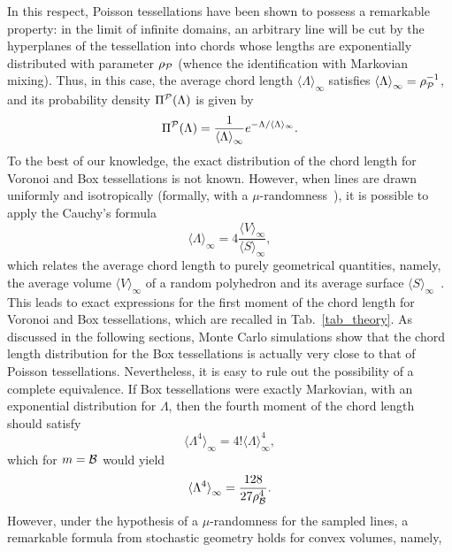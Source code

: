 \documentclass[final,authoryear,5p,times,twocolumn]{elsarticle}
\begin{document}
In this respect, Poisson tessellations have been shown to possess a remarkable property: in the limit of infinite domains, an arbitrary line will be cut by the hyperplanes of the tessellation into chords whose lengths are exponentially distributed with parameter $\rho_{\cal P}$ (whence the identification with Markovian mixing). Thus, in this case, the average chord length ${\langle \Lambda \rangle}_{\infty}$ satisfies ${\langle \Lambda \rangle}_{\infty}=\rho_{\cal P}^{-1}$, and its probability density $\Pi^{\cal P}(\Lambda)$ is given by
\begin{equation}
\Pi^{\cal P}(\Lambda)= \frac{1}{{\langle \Lambda \rangle}_{\infty}} e^{-\Lambda / \langle \Lambda \rangle_{\infty}}.
\end{equation}\label{markovian_density}
To the best of our knowledge, the exact distribution of the chord length for Voronoi and Box tessellations is not known. However, when lines are drawn uniformly and isotropically (formally, with a $\mu$-randomness~\cite{santalo, coleman}), it is possible to apply the Cauchy's formula
\begin{equation}
{\langle \Lambda \rangle}_{\infty} = 4 \dfrac{{\langle V \rangle}_{\infty}}{{\langle S \rangle}_{\infty}},
\end{equation}
which relates the average chord length to purely geometrical quantities, namely, the average volume ${\langle V \rangle}_{\infty}$ of a random polyhedron and its average surface ${\langle S \rangle}_{\infty}$~\cite{santalo}. This leads to exact expressions for the first moment of the chord length for Voronoi and Box tessellations, which are recalled in Tab.~\ref{tab_theory}. As discussed in the following sections, Monte Carlo simulations show that the chord length distribution for the Box tessellations is actually very close to that of Poisson tessellations. Nevertheless, it is easy to rule out the possibility of a complete equivalence. If Box tessellations were exactly Markovian, with an exponential distribution for $\Lambda$, then the fourth moment of the chord length should satisfy
\begin{equation}
{\langle \Lambda^4 \rangle}_{\infty} = 4! {\langle \Lambda \rangle}_{\infty}^4,
\label{moment4_0}
\end{equation}
which for $m={\cal B}$ would yield
\begin{equation}
{\langle \Lambda^4 \rangle}_{\infty} = \dfrac{128}{27 \rho_{\cal B}^{4}}.
\label{moment4}
\end{equation}
However, under the hypothesis of a $\mu$-randomness for the sampled lines, a remarkable formula from stochastic geometry holds for convex volumes, namely,
\end{document}

